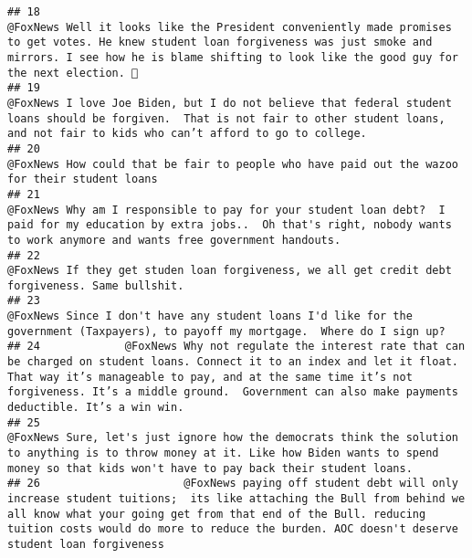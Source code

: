 \documentclass[
]{article}
\begin{document}
\begin{verbatim}
## 18                                                                      @FoxNews Well it looks like the President conveniently made promises to get votes. He knew student loan forgiveness was just smoke and mirrors. I see how he is blame shifting to look like the good guy for the next election. 🤣
## 19                                                                                                        @FoxNews I love Joe Biden, but I do not believe that federal student loans should be forgiven.  That is not fair to other student loans, and not fair to kids who can’t afford to go to college.
## 20                                                                                                                                                                                                           @FoxNews How could that be fair to people who have paid out the wazoo for their student loans
## 21                                                                                                            @FoxNews Why am I responsible to pay for your student loan debt?  I paid for my education by extra jobs..  Oh that's right, nobody wants to work anymore and wants free government handouts.
## 22                                                                                                                                                                                                        @FoxNews If they get studen loan forgiveness, we all get credit debt forgiveness. Same bullshit.
## 23                                                                                                                                                                      @FoxNews Since I don't have any student loans I'd like for the government (Taxpayers), to payoff my mortgage.  Where do I sign up?
## 24             @FoxNews Why not regulate the interest rate that can be charged on student loans. Connect it to an index and let it float. That way it’s manageable to pay, and at the same time it’s not forgiveness. It’s a middle ground.  Government can also make payments deductible. It’s a win win.
## 25                                                                                                 @FoxNews Sure, let's just ignore how the democrats think the solution to anything is to throw money at it. Like how Biden wants to spend money so that kids won't have to pay back their student loans.
## 26                      @FoxNews paying off student debt will only increase student tuitions;  its like attaching the Bull from behind we all know what your going get from that end of the Bull. reducing  tuition costs would do more to reduce the burden. AOC doesn't deserve student loan forgiveness

\end{verbatim}
\end{document}
